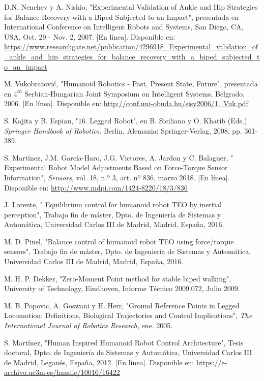 \begin{thebibliography}{99}
 D.N. Nenchev y A. Nishio, "Experimental Validation of Ankle and Hip Strategies for Balance Recovery with a Biped Subjected to an Impact", presentada en International Conference on Intelligent Robots and Systems, San Diego, CA, USA, Oct. 29 - Nov. 2, 2007. [En línea]. Disponible en: \url{https://www.researchgate.net/publication/4296918_Experimental_validation_of_ankle_and_hip_strategies_for_balance_recovery_with_a_biped_subjected_to_an_impact}

 M. Vukobratović, "Humanoid Robotics - Past, Present State, Future", presentada en $4^{th}$ Serbian-Hungarian Joint Symposium on Intelligent Systems, Belgrado, 2006. [En línea]. Disponible en: \url{http://conf.uni-obuda.hu/sisy2006/1_Vuk.pdf}

 S. Kajita y B. Espiau, "16. Legged Robot", en B. Siciliano y O. Khatib (Eds.) \textit{Springer Handbook of Robotics}. Berlin, Alemania: Springer-Verlag, 2008, pp. 361-389.  

 S. Martínez, J.M. García-Haro, J.G. Victores, A. Jardon y C. Balaguer, " Experimental Robot Model Adjustments Based on Force-Torque Sensor Information", \textit{Sensors}, vol. 18, n.º 3, art. nº 836, marzo 2018. [En línea]. Disponible en: \url{http://www.mdpi.com/1424-8220/18/3/836} 

 J. Lorente, " Equilibrium control for humanoid robot TEO by inertial perception", Trabajo fin de máster, Dpto. de Ingeniería de Sistemas y Automática, Universidad Carlos III de Madrid, Madrid, España, 2016.

 M. D. Pinel, "Balance control of humanoid robot TEO using force/torque sensors", Trabajo fin de máster, Dpto. de Ingeniería de Sistemas y Automática, Universidad Carlos III de Madrid, Madrid, España, 2016.

 M. H. P. Dekker, "Zero-Moment Point method for stable biped walking", University of Technology, Eindhoven, Informe Técnico 2009.072, Julio 2009.

 M. B. Popovic, A. Goswani y H. Herr, "Ground Reference Points in Legged Locomotion: Definitions, Biological Trajectories and Control Implications", \textit{The International Journal of Robotics Research}, ene. 2005. 

 S. Martínez, "Human Inspired Humanoid Robot Control Architecture", Tesis doctoral, Dpto. de Ingeniería de Sistemas y Automática, Universidad Carlos III de Madrid, Leganés, España, 2012. [En línea]. Disponible en: \url{https://e-archivo.uc3m.es/handle/10016/16422}


\end{thebibliography}

